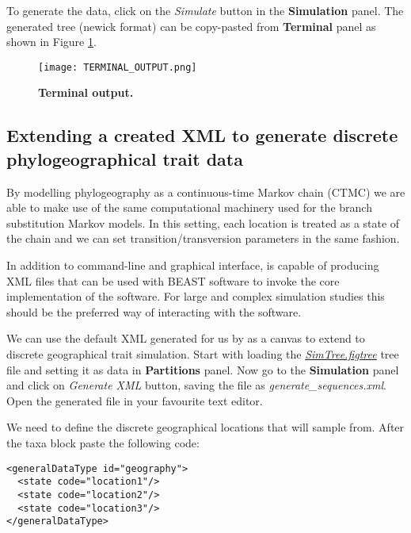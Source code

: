 To generate the data, click on the \emph{Simulate} button in the \textbf{Simulation} panel. The generated tree (newick format) can be copy-pasted from \textbf{Terminal} panel as shown in Figure \ref{fig:Terminal}.

\begin{figure}[h!]
\centering
\texttt{[image: TERMINAL\_OUTPUT.png]} 
\caption{
{ \footnotesize 
{\bf Terminal output.}
} %
}
\label{fig:Terminal}
\end{figure} 

\subsection{Extending a created XML to generate discrete phylogeographical trait data}
By modelling  phylogeography as a continuous-time Markov chain (CTMC) we are able to make use of the same computational machinery used for the branch substitution Markov models. In this setting, each location is treated as a state of the chain and we can set transition/transversion parameters in the same fashion.

In addition to command-line and graphical interface, {\bussname} is capable of producing XML files that can be used with BEAST software to invoke the core implementation of the software. 
For large and complex simulation studies this should be the preferred way of interacting with the software.

We can use the default XML generated for us by {\bussname} as a canvas to extend to discrete geographical trait simulation. 
Start with loading the \href{http://rega.kuleuven.be/cev/ecv/software/buss_files/simtree.figtree}{\emph{SimTree.figtree}} tree file and setting it as data in \textbf{Partitions} panel. 
Now go to the \textbf{Simulation} panel and click on \emph{Generate XML} button, saving the file as \emph{generate\_sequences.xml}.
Open the generated file in your favourite text editor.

We need to define the discrete geographical locations that {\bussname} will sample from. After the  {\color{darkblue}\mbox{taxa}} block paste the following code:

\medskip{}

\begin{lstlisting}
<generalDataType id="geography"> 
  <state code="location1"/>
  <state code="location2"/>
  <state code="location3"/>
</generalDataType>
\end{lstlisting}

